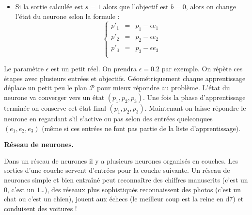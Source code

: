 \documentclass[10pt,class=report,crop=false]{standalone}
\begin{document}
\begin{cours}[Neurone]
\begin{itemize}
	\item Si la sortie calculée est $s=1$ alors que l'objectif est $b=0$, alors on change l'état du neurone selon la formule :
$$\left\{ 
\begin{array}{rcl}
p'_1 &=& p_1 - \epsilon e_1 \\
p'_2 &=& p_2 - \epsilon e_2 \\
p'_3 &=& p_3 - \epsilon e_3 \\
\end{array}
\right.$$
\end{itemize}

Le paramètre $\epsilon$ est un petit réel. On prendra $\epsilon = 0.2$ par exemple.
On répète ces étapes avec plusieurs entrées et objectifs. Géométriquement chaque apprentissage déplace un petit peu le plan $\mathcal{P}$ pour mieux répondre au problème. L'état du neurone va converger vers un état $(p_1,p_2,p_3)$. 
Une fois la phase d'apprentissage terminée on conserve cet état final $(p_1,p_2,p_3)$. Maintenant 
on laisse répondre le neurone en regardant s'il s'active ou pas selon des entrées quelconques $(e_1,e_2,e_3)$ (même si ces entrées ne font pas partie de la liste d'apprentissage).


\medskip
\textbf{Réseau de neurones.}

Dans un réseau de neurones il y a plusieurs neurones organisés en couches. Les sorties d'une couche servent d'entrées pour la couche suivante. Un réseau de neurones simple et bien entraîné peut reconnaître des chiffres manuscrits (c'est un $0$, c'est un $1$\ldots), des réseaux plus sophistiqués reconnaissent des photos (c'est un chat ou c'est un chien), jouent aux échecs (le meilleur coup est
la reine en d7) et conduisent des voitures !


\end{cours}
\end{document}

